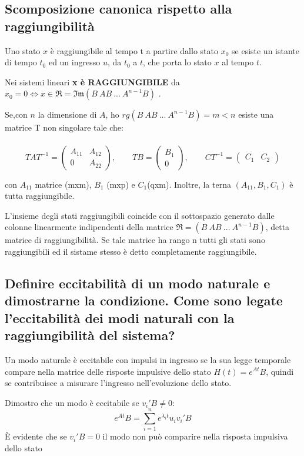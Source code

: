 \documentclass{article}
\begin{document}
\subsection{Scomposizione canonica rispetto alla raggiungibilità}
Uno stato $x$ è raggiungibile al tempo t a partire dallo stato $x_0$ se esiste un istante di tempo $t_0 $
ed un ingresso $u$, da $t_0$ a $t$, che porta lo stato $x$ al tempo $t$.

Nei sistemi lineari \textbf{x è RAGGIUNGIBILE} da
$x_0=0 \Longleftrightarrow x \in \mathfrak{R} = \mathfrak{Im}(B\ AB\ ...\ A^{n-1}B)$ .

Se,con $n$ la dimensione di $A$, ho $rg(B\ AB\ ...\ A^{n-1}B)=m<n$ esiste una matrice T non singolare tale che:\\\\
\[
TAT^{-1}= \begin{pmatrix}
A_{11} & A_{12}\\
0 & A_{22}
\end{pmatrix}
,
\hspace{2em}
TB = \begin{pmatrix}
B_1\\
0
\end{pmatrix}
,
\hspace{2em}
CT^{-1} = \begin{pmatrix}
C_1 & C_2
\end{pmatrix}
\]

con $A_{11}$ matrice (mxm), $B_1$ (mxp) e $C_1$(qxm). Inoltre, la terna $(A_{11},B_1,C_1)$ è tutta raggiungibile.

L'insieme degli stati raggiungibili coincide con il sottospazio generato dalle colonne
linearmente indipendenti della matrice $\mathfrak{R}=(B\ AB\ ...\ A^{n-1}B)$, 
detta matrice di raggiungibilità. Se tale matrice ha rango n tutti gli stati sono raggiungibili
ed il sistame stesso è detto completamente raggiungibile.


\subsection{Definire eccitabilità di un modo naturale e dimostrarne la condizione. Come sono legate l'eccitabilità dei modi naturali con la raggiungibilità del sistema?}
Un modo naturale è eccitabile con impulsi in ingresso se la sua legge temporale compare
nella matrice delle risposte impulsive dello stato $ H(t)=e^{A t}B$,
quindi se contribuisce a misurare l'ingresso nell'evoluzione dello stato.

Dimostro che un modo è eccitabile se $v_i'B\neq 0$:
\[ e^{At}B = \sum_{i=1}^{n}e^{\lambda_i t} u_i v_i'B \]
È evidente che se  $v_i'B = 0$ il modo non può comparire nella risposta impulsiva dello stato
\end{document}
